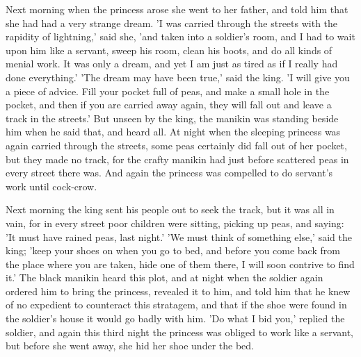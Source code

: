 \documentclass[12pt]{book}
\begin{document}
Next morning when the princess arose she went to her father, and told
him that she had had a very strange dream. 'I was carried through the
streets with the rapidity of lightning,' said she, 'and taken into a
soldier's room, and I had to wait upon him like a servant, sweep his
room, clean his boots, and do all kinds of menial work. It was only a
dream, and yet I am just as tired as if I really had done everything.'
'The dream may have been true,' said the king. 'I will give you a
piece of advice. Fill your pocket full of peas, and make a small hole
in the pocket, and then if you are carried away again, they will fall
out and leave a track in the streets.' But unseen by the king, the
manikin was standing beside him when he said that, and heard all. At
night when the sleeping princess was again carried through the
streets, some peas certainly did fall out of her pocket, but they made
no track, for the crafty manikin had just before scattered peas in
every street there was. And again the princess was compelled to do
servant's work until cock-crow.

Next morning the king sent his people out to seek the track, but it
was all in vain, for in every street poor children were sitting,
picking up peas, and saying: 'It must have rained peas, last night.'
'We must think of something else,' said the king; 'keep your shoes on
when you go to bed, and before you come back from the place where you
are taken, hide one of them there, I will soon contrive to find it.'
The black manikin heard this plot, and at night when the soldier again
ordered him to bring the princess, revealed it to him, and told him
that he knew of no expedient to counteract this stratagem, and that if
the shoe were found in the soldier's house it would go badly with him.
'Do what I bid you,' replied the soldier, and again this third night
the princess was obliged to work like a servant, but before she went
away, she hid her shoe under the bed.
\end{document}
